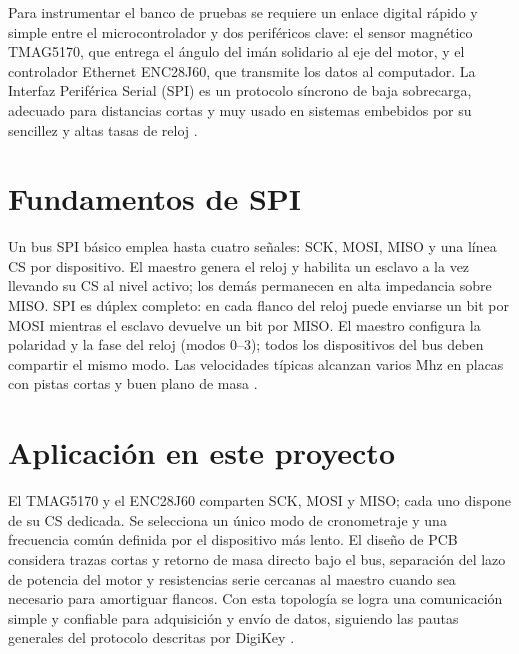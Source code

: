 Para instrumentar el banco de pruebas se requiere un enlace digital rápido y simple entre el microcontrolador y dos periféricos clave: el sensor magnético TMAG5170, que entrega el ángulo del imán solidario al eje del motor, y el controlador Ethernet ENC28J60, que transmite los datos al computador. La Interfaz Periférica Serial (SPI) es un protocolo síncrono de baja sobrecarga, adecuado para distancias cortas y muy usado en sistemas embebidos por su sencillez y altas tasas de reloj \autocite{Pini2019_SPI_DigiKey}.

\section{Fundamentos de SPI}
Un bus SPI básico emplea hasta cuatro señales: SCK, MOSI, MISO y una línea CS por dispositivo. El maestro genera el reloj y habilita un esclavo a la vez llevando su CS al nivel activo; los demás permanecen en alta impedancia sobre MISO. SPI es dúplex completo: en cada flanco del reloj puede enviarse un bit por MOSI mientras el esclavo devuelve un bit por MISO. El maestro configura la polaridad y la fase del reloj (modos 0–3); todos los dispositivos del bus deben compartir el mismo modo. Las velocidades típicas alcanzan varios Mhz en placas con pistas cortas y buen plano de masa \cite{Pini2019_SPI_DigiKey}.

\section{Aplicación en este proyecto}
El TMAG5170 y el ENC28J60 comparten SCK, MOSI y MISO; cada uno dispone de su CS dedicada. Se selecciona un único modo de cronometraje y una frecuencia común definida por el dispositivo más lento. El diseño de PCB considera trazas cortas y retorno de masa directo bajo el bus, separación del lazo de potencia del motor y resistencias serie cercanas al maestro cuando sea necesario para amortiguar flancos. Con esta topología se logra una comunicación simple y confiable para adquisición y envío de datos, siguiendo las pautas generales del protocolo descritas por DigiKey \cite{Pini2019_SPI_DigiKey}.
